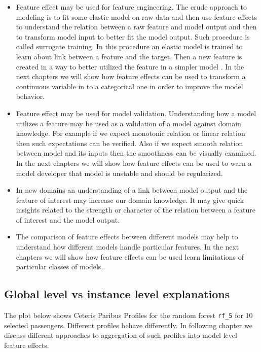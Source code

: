 \documentclass[12pt,]{krantz}
\providecommand{\tightlist}{%
  \setlength{\itemsep}{0pt}\setlength{\parskip}{0pt}}
\begin{document}
\begin{itemize}
\tightlist
\item
  Feature effect may be used for feature engineering. The crude approach to modeling is to fit some elastic model on raw data and then use feature effects to understand the relation between a raw feature and model output and then to transform model input to better fit the model output. Such procedure is called surrogate training. In this procedure an elastic model is trained to learn about link between a feature and the target. Then a new feature is created in a way to better utilized the feature in a simpler model \citep{SAFE-arxiv}. In the next chapters we will show how feature effects can be used to transform a continuous variable in to a categorical one in order to improve the model behavior.
\item
  Feature effect may be used for model validation. Understanding how a model utilizes a feature may be used as a validation of a model against domain knowledge. For example if we expect monotonic relation or linear relation then such expectations can be verified. Also if we expect smooth relation between model and its inputs then the smoothness can be visually examined. In the next chapters we will show how feature effects can be used to warn a model developer that model is unstable and should be regularized.
\item
  In new domains an understanding of a link between model output and the feature of interest may increase our domain knowledge. It may give quick insights related to the strength or character of the relation between a feature of interest and the model output.
\item
  The comparison of feature effects between different models may help to understand how different models handle particular features. In the next chapters we will show how feature effects can be used learn limitations of particular classes of models.
\end{itemize}

\hypertarget{global-level-vs-instance-level-explanations}{%
\subsection{Global level vs instance level explanations}\label{global-level-vs-instance-level-explanations}}

The plot below shows Ceteris Paribus Profiles for the random forest \texttt{rf\_5} for 10 selected passengers.
Different profiles behave differently. In following chapter we discuss different approaches to aggregation of such profiles into model level feature effects.
\end{document}
